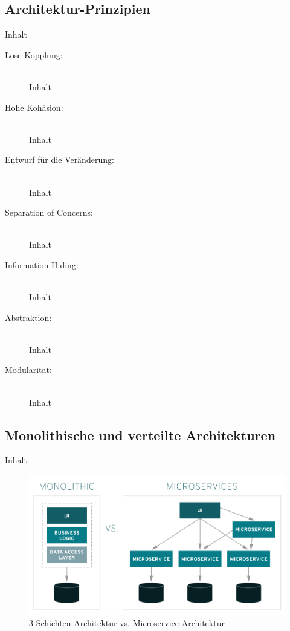 \subsection{Architektur-Prinzipien\label{subsec2.1.1:Unterunterpunkt-1}}

Inhalt

\begin{description}
    \item[Lose Kopplung:]\hfill \\
    Inhalt

    \item[Hohe Kohäsion:]\hfill \\
    Inhalt

    \item[Entwurf für die Veränderung:]\hfill \\
    Inhalt

    \item[Separation of Concerns:]\hfill \\
    Inhalt

    \item[Information Hiding:]\hfill \\
    Inhalt

    \item[Abstraktion:]\hfill \\
    Inhalt

    \item[Modularität:]\hfill \\
    Inhalt

\end{description}

\subsection{Monolithische und verteilte Architekturen\label{subsec2.1.2:Unterunterpunkt-2}}

Inhalt

\begin{figure}[H]
    \centering
    \includegraphics[width=0.7\linewidth]{images/monolithic-vs-microservices.png}
    \caption{3-Schichten-Architektur vs. Microservice-Architektur \cite{RedHatLimited.2021}}
    \label{fig:mono_vs_micro}
\end{figure}


